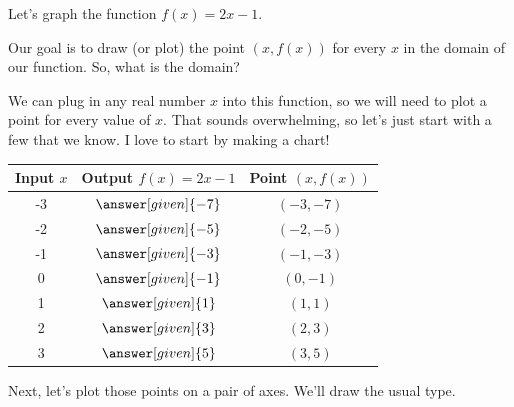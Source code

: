 \documentclass{ximera}
\begin{document}
\begin{example}
Let's graph the function $f(x) = 2x-1$.

Our goal is to draw (or plot) the point $(x,f(x))$ for every $x$ in the domain of our function. So, what is the domain?
\begin{multipleChoice}
\end{multipleChoice}
We can plug in any real number $x$ into this function, so we will need to plot a point for every value of $x$. That sounds overwhelming, so let's just start with a few that we know. I love to start by making a chart!
\begin{image}
\begin{tabular}{c|c|c}
Input $x$ & Output $f(x)=2x-1$ & Point $(x, f(x))$ \\ \hline
-3 & $\answer[given]{-7}$ & $(-3, -7)$ \\ \hline
-2 & $\answer[given]{-5}$ & $(-2, -5)$ \\ \hline
-1 & $\answer[given]{-3}$ & $(-1, -3)$ \\ \hline
0 & $\answer[given]{-1}$ & $(0, -1)$ \\ \hline
1 & $\answer[given]{1}$ & $(1, 1)$ \\ \hline
2 & $\answer[given]{3}$ & $(2, 3)$ \\ \hline
3 & $\answer[given]{5}$ & $(3, 5)$ \\ \hline
\end{tabular}
\end{image}
Next, let's plot those points on a pair of axes. We'll draw the usual type. 
\begin{image}

\end{image}
\end{example}
\end{document}

